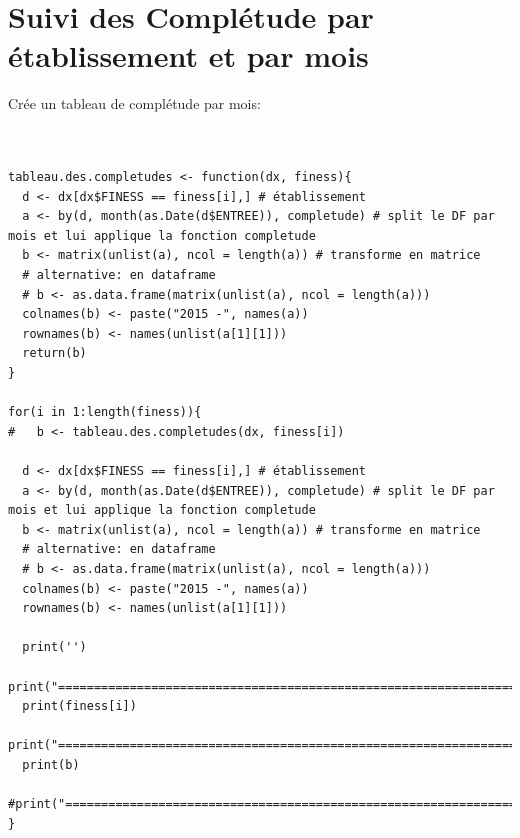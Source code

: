 \documentclass[]{article}
\begin{document}
\section{Suivi des Complétude par établissement et par
mois}\label{suivi-des-completude-par-etablissement-et-par-mois}

Crée un tableau de complétude par mois:

\begin{verbatim}


tableau.des.completudes <- function(dx, finess){
  d <- dx[dx$FINESS == finess[i],] # établissement
  a <- by(d, month(as.Date(d$ENTREE)), completude) # split le DF par mois et lui applique la fonction completude
  b <- matrix(unlist(a), ncol = length(a)) # transforme en matrice
  # alternative: en dataframe
  # b <- as.data.frame(matrix(unlist(a), ncol = length(a)))
  colnames(b) <- paste("2015 -", names(a))
  rownames(b) <- names(unlist(a[1][1]))
  return(b)
}

for(i in 1:length(finess)){
#   b <- tableau.des.completudes(dx, finess[i])
  
  d <- dx[dx$FINESS == finess[i],] # établissement
  a <- by(d, month(as.Date(d$ENTREE)), completude) # split le DF par mois et lui applique la fonction completude
  b <- matrix(unlist(a), ncol = length(a)) # transforme en matrice
  # alternative: en dataframe
  # b <- as.data.frame(matrix(unlist(a), ncol = length(a)))
  colnames(b) <- paste("2015 -", names(a))
  rownames(b) <- names(unlist(a[1][1]))
  
  print('')
  print("=====================================================================")
  print(finess[i])
  print("=====================================================================")
  print(b)
  #print("=====================================================================")
}
\end{verbatim}
\end{document}
